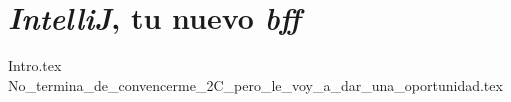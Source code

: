 \chapter{\textit{IntelliJ}, tu nuevo \textit{bff}}
  {Intro.tex}
  {No_termina_de_convencerme_2C_pero_le_voy_a_dar_una_oportunidad.tex}
  \nocite{*}
  \printbibliography[keyword=intellij]
